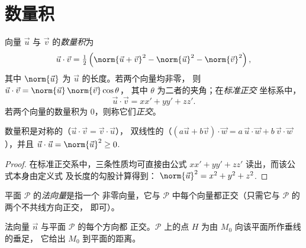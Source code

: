\section{数量积}

\begin{definition}[数量积]\label{def:g12:space:dot}
向量 $\vec u$ 与 $\vec v$ 的\emph{数量积}为
\[
\vec u \cdot \vec v = \tfrac12\left(\norm{\vec u + \vec v}^2
- \norm{\vec u}^2 - \norm{\vec v}^2\right),
\]
其中 $\norm{\vec u}$ 为 $\vec u$ 的长度。若两个向量均非零，
则 $\vec u \cdot \vec v = \norm{\vec u}\,\norm{\vec v}\cos\theta$，
其中 $\theta$ 为二者的夹角；在\emph{标准正交}
坐标系中，
\[
\vec u \cdot \vec v = xx' + yy' + zz' .
\]
若两个向量的数量积为 $0$，则称它们\emph{正交}。
\end{definition}

\begin{proposition}[性质]\label{prop:g12:space:dotprops}
数量积是对称的（$\vec u\cdot\vec v = \vec v\cdot\vec u$），
双线性的（$(a\vec u + b\vec v)\cdot \vec w = a\,\vec u\cdot\vec w +
b\,\vec v\cdot \vec w$），并且
$\vec u \cdot \vec u = \norm{\vec u}^2 \geq 0$.
\end{proposition}

\begin{proof}
在标准正交系中，三条性质均可直接由公式
$xx' + yy' + zz'$ 读出，而该公式本身由定义式
及长度的勾股计算得到：
$\norm{\vec u}^2 = x^2 + y^2 + z^2$.
\end{proof}

\begin{definition}[法向量]\label{def:g12:space:normal}
平面 $\mathcal P$ 的\emph{法向量}是指一个
非零向量，它与 $\mathcal P$ 中每个向量都正交（只需它与
$\mathcal P$ 的两个不共线方向正交，
即可）。
\end{definition}

\begin{omfigure}

{\small 法向量 $\vec n$ 与平面 $\mathcal P$ 的每个方向都
正交。$\mathcal P$ 上的点 $H$ 为由 $M_0$ 向该平面所作垂线的垂足，
它给出 $M_0$ 到平面的距离。}
\end{omfigure}

